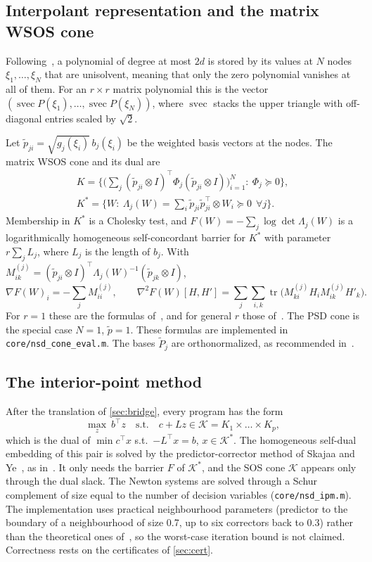 \documentclass[11pt,a4paper]{article}
\newcommand{\tr}{\operatorname{tr}}
\newcommand{\svec}{\operatorname{svec}}
\newcommand{\cK}{\mathcal{K}}
\newcommand{\code}[1]{\texttt{#1}}
\begin{document}
\subsection{Interpolant representation and the matrix WSOS cone}
Following~\cite{LofbergParrilo2004,PappYildiz2019}, a polynomial of degree at most $2d$ is stored by its values at $N$ nodes $\xi_1,\dots,\xi_N$ that are unisolvent, meaning that only the zero polynomial vanishes at all of them. For an $r\times r$ matrix polynomial this is the vector $(\svec P(\xi_1),\dots,\svec P(\xi_N))$, where $\svec$ stacks the upper triangle with off-diagonal entries scaled by $\sqrt2$.

Let $\tilde p_{ji}=\sqrt{g_j(\xi_i)}\,b_j(\xi_i)$ be the weighted basis vectors at the nodes. The matrix WSOS cone and its dual are~\cite{KCV2023,PappAlizadeh2013}
\begin{gather*}
K=\Big\{\big(\textstyle\sum_j(\tilde p_{ji}\otimes I)^\top\Phi_j(\tilde p_{ji}\otimes I)\big)_{i=1}^N:\ \Phi_j\succeq0\Big\},\\
K^\ast=\Big\{W:\ \Lambda_j(W)=\textstyle\sum_i\tilde p_{ji}\tilde p_{ji}^\top\otimes W_i\succeq0\ \ \forall j\Big\}.
\end{gather*}
Membership in $K^\ast$ is a Cholesky test, and $F(W)=-\sum_j\log\det\Lambda_j(W)$ is a logarithmically homogeneous self-concordant barrier for $K^\ast$ with parameter $r\sum_jL_j$, where $L_j$ is the length of $b_j$. With $M^{(j)}_{ik}=(\tilde p_{ji}\otimes I)^\top\Lambda_j(W)^{-1}(\tilde p_{jk}\otimes I)$,
\[
\nabla F(W)_i=-\sum_jM^{(j)}_{ii},\qquad \nabla^2F(W)[H,H']=\sum_j\sum_{i,k}\tr\big(M^{(j)}_{ki}H_iM^{(j)}_{ik}H'_k\big).
\]
For $r=1$ these are the formulas of~\cite{PappYildiz2019}, and for general $r$ those of~\cite[Sec.~5.1]{KCV2023}. The PSD cone is the special case $N=1$, $\tilde p=1$. These formulas are implemented in \code{core/nsd\_cone\_eval.m}. The bases $\tilde P_j$ are orthonormalized, as recommended in~\cite[Sec.~4.1]{PappYildiz2019}.

\subsection{The interior-point method}
After the translation of \cref{sec:bridge}, every program has the form
\[
\max_z\ b^\top z\quad\text{s.t.}\quad c+Lz\in\cK=K_1\times\dots\times K_p ,
\]
which is the dual of $\min c^\top x$ s.t.\ $-L^\top x=b$, $x\in\cK^\ast$. The homogeneous self-dual embedding of this pair is solved by the predictor-corrector method of Skajaa and Ye~\cite{SkajaaYe2015}, as in~\cite{PappYildiz2019,PappYildiz2017}. It only needs the barrier $F$ of $\cK^\ast$, and the SOS cone $\cK$ appears only through the dual slack. The Newton systems are solved through a Schur complement of size equal to the number of decision variables (\code{core/nsd\_ipm.m}). The implementation uses practical neighbourhood parameters (predictor to the boundary of a neighbourhood of size 0.7, up to six correctors back to 0.3) rather than the theoretical ones of~\cite{PappYildiz2017}, so the worst-case iteration bound is not claimed. Correctness rests on the certificates of \cref{sec:cert}.
\end{document}
